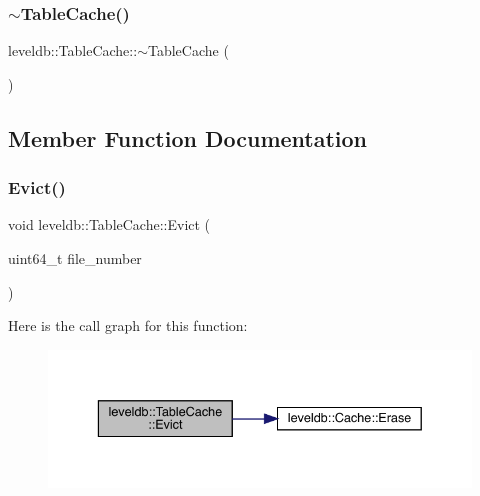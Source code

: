 \mbox{\label{classleveldb_1_1_table_cache_a5690fd10ea7cc7f0d44c8e768bea872c}} 
\subsubsection{\texorpdfstring{$\sim$TableCache()}{~TableCache()}}
{\footnotesize\ttfamily leveldb\+::\+Table\+Cache\+::$\sim$\+Table\+Cache (\begin{DoxyParamCaption}{ }\end{DoxyParamCaption})}



\subsection{Member Function Documentation}
\mbox{\label{classleveldb_1_1_table_cache_a57b81c58ff0533514b3a5d1652f044bc}} 
\subsubsection{\texorpdfstring{Evict()}{Evict()}}
{\footnotesize\ttfamily void leveldb\+::\+Table\+Cache\+::\+Evict (\begin{DoxyParamCaption}\item[{uint64\+\_\+t}]{file\+\_\+number }\end{DoxyParamCaption})}

Here is the call graph for this function\+:
\nopagebreak
\begin{figure}[H]
\begin{center}
\leavevmode
\includegraphics[width=336pt]{classleveldb_1_1_table_cache_a57b81c58ff0533514b3a5d1652f044bc_cgraph}
\end{center}
\end{figure}
\mbox{\label{classleveldb_1_1_table_cache_af43ba38b52742e9f5589321747535444}} 
